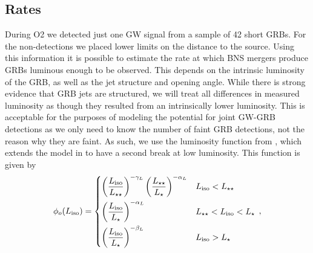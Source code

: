 \documentclass[11pt]{cuthesis}
\begin{document}
\subsection{Rates}
During O2 we detected just one GW signal from a sample of 42 short GRBs. For the non-detections we placed lower limits on the distance to the source. Using this information it is possible to estimate the rate at which BNS mergers produce GRBs luminous enough to be observed. This depends on the intrinsic luminosity of the GRB, as well as the jet structure and opening angle. While there is strong evidence that GRB jets are structured, we will treat all differences in measured luminosity as though they resulted from an intrinsically lower luminosity. This is acceptable for the purposes of modeling the potential for joint GW-GRB detections as we only need to know the number of faint GRB detections, not the reason why they are faint. As such, we use the luminosity function from \cite{GW170817_GRB}, which extends the model in \cite{wanderman} to have a second break at low luminosity. This function is given by
\begin{equation}
    \label{grb luminosity}
    \phi_{o}(L_\text{iso}) = 
    \begin{dcases}
          \left(\frac{L_\text{iso}}{L_{\star\star}}\right)^{-\gamma_L}\left(\frac{L_{\star\star}}{L_{\star}}\right)^{-\alpha_L} & L_\text{iso} < L_{\star\star} \\
           \left(\frac{L_\text{iso}}{L_{\star}}\right)^{-\alpha_L} & L_{\star\star} <L_\text{iso} < L_{\star} \\
            \left(\frac{L_\text{iso}}{L_{\star}}\right)^{-\beta_L} & L_\text{iso} > L_{\star} 
    \end{dcases} \, ,
\end{equation}
\end{document}
